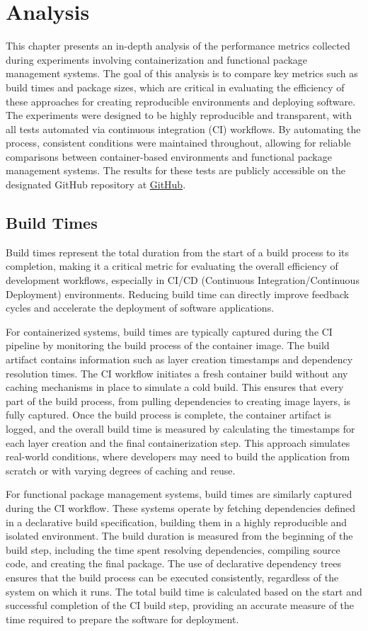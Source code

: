 \chapter{Analysis}
This chapter presents an in-depth analysis of the performance metrics collected during
experiments involving containerization and functional package management systems. The goal
of this analysis is to compare key metrics such as build times and package sizes, which are
critical in evaluating the efficiency of these approaches for creating reproducible
environments and deploying software. The experiments were designed to be highly reproducible
and transparent, with all tests automated via continuous integration (CI) workflows. By
automating the process, consistent conditions were maintained throughout, allowing for
reliable comparisons between container-based environments and functional package management
systems. The results for these tests are publicly accessible on the designated GitHub repository
at \href{https://github.com/clemenscodes/webserver/actions}{GitHub}.

\section{Build Times}
Build times represent the total duration from the start of a build process to its completion,
making it a critical metric for evaluating the overall efficiency of development workflows,
especially in CI/CD (Continuous Integration/Continuous Deployment) environments. Reducing
build time can directly improve feedback cycles and accelerate the deployment of software
applications.

For containerized systems, build times are typically captured during the CI pipeline by
monitoring the build process of the container image. The build artifact contains information
such as layer creation timestamps and dependency resolution times. The CI workflow initiates
a fresh container build without any caching mechanisms in place to simulate a cold build.
This ensures that every part of the build process, from pulling dependencies to creating
image layers, is fully captured. Once the build process is complete, the container artifact
is logged, and the overall build time is measured by calculating the timestamps for each
layer creation and the final containerization step. This approach simulates real-world
conditions, where developers may need to build the application from scratch or with varying
degrees of caching and reuse.

For functional package management systems, build times are similarly captured during the CI
workflow. These systems operate by fetching dependencies defined in a declarative build
specification, building them in a highly reproducible and isolated environment. The build
duration is measured from the beginning of the build step, including the time spent resolving
dependencies, compiling source code, and creating the final package. The use of declarative
dependency trees ensures that the build process can be executed consistently, regardless of
the system on which it runs. The total build time is calculated based on the start and
successful completion of the CI build step, providing an accurate measure of the time
required to prepare the software for deployment.

